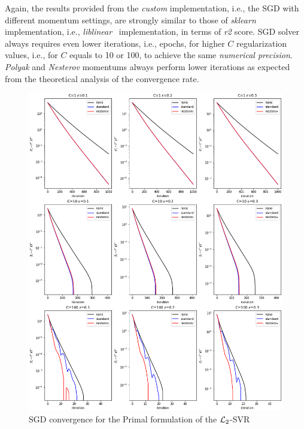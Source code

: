 

Again, the results provided from the \emph{custom} implementation, i.e., the SGD with different momentum settings, are strongly similar to those of \emph{sklearn} implementation, i.e., \emph{liblinear}~\cite{fan2008liblinear} implementation, in terms of \emph{r2} score. SGD solver always requires even lower iterations, i.e., epochs, for higher $C$ regularization values, i.e., for $C$ equals to 10 or 100, to achieve the same \emph{numerical precision}. \emph{Polyak} and \emph{Nesterov} momentums always perform lower iterations as expected from the theoretical analysis of the convergence rate.

\begin{figure}[H]
	\centering
	\includegraphics[scale=0.5]{img/l2_svr_loss_history}
	\caption{SGD convergence for the Primal formulation of the $\protect \mathcal{L}_2$-SVR}
	\label{fig:l2_svr_loss_history}
\end{figure}
